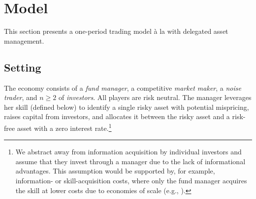 \section{Model}\label{sec:Model}

This section presents a one-period trading model à la \citet{kyle1985continuous} with delegated asset management. 

\subsection{Setting}
The economy consists of a \textit{fund manager}, a competitive \textit{market maker}, a \textit{noise trader}, and $n\ge 2$ of \textit{investors}. All players are risk neutral. The manager leverages her skill (defined below) to identify a single risky asset with potential mispricing, raises capital from investors, and allocates it between the risky asset and a risk-free asset with a zero interest rate.\footnote{We abstract away from information acquisition by individual investors and assume that they invest through a manager due to the lack of informational advantages. This assumption would be supported by, for example, information- or skill-acquisition costs, where only the fund manager acquires the skill at lower costs due to economies of scale (e.g., \citealp{garleanu2018efficiently}).}

